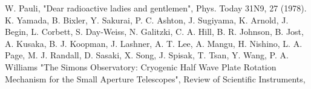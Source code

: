 \begin{thebibliography}{99}

 W. Pauli, "Dear radioactive ladies and gentlemen", Phys. Today 31N9, 27 (1978).
 K. Yamada, B. Bixler, Y. Sakurai, P. C. Ashton, J. Sugiyama, 
    K. Arnold, J. Begin, L. Corbett, S. Day-Weiss, N. Galitzki, C. A. Hill, B. R. Johnson, 
    B. Jost, A. Kusaka, B. J. Koopman, J. Lashner, A. T. Lee, A. Mangu, H. Nishino, 
    L. A. Page, M. J. Randall, D. Sasaki, X. Song, J. Spisak, T. Tsan, Y. Wang, P. A. Williams
    "The Simons Observatory: Cryogenic Half Wave Plate Rotation Mechanism for the Small Aperture Telescopes", 
    Review of Scientific Instruments, 

\end{thebibliography}
